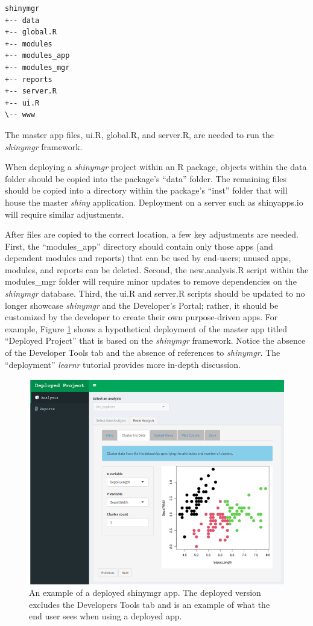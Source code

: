 \begin{verbatim}
shinymgr
+-- data
+-- global.R
+-- modules
+-- modules_app
+-- modules_mgr
+-- reports
+-- server.R
+-- ui.R
\-- www
\end{verbatim}

The master app files, ui.R, global.R, and server.R, are needed to run the \emph{shinymgr} framework.

When deploying a \emph{shinymgr} project within an R package, objects within the data folder should be copied into the package's ``data'' folder. The remaining files should be copied into a directory within the package's ``inst'' folder that will house the master \emph{shiny} application. Deployment on a server such as shinyapps.io will require similar adjustments.

After files are copied to the correct location, a few key adjustments are needed. First, the ``modules\_app'' directory should contain only those apps (and dependent modules and reports) that can be used by end-users; unused apps, modules, and reports can be deleted. Second, the new.analysis.R script within the modules\_mgr folder will require minor updates to remove dependencies on the \emph{shinymgr} database. Third, the ui.R and server.R scripts should be updated to no longer showcase \emph{shinymgr} and the Developer's Portal; rather, it should be customized by the developer to create their own purpose-driven apps. For example, Figure \ref{fig:fig6} shows a hypothetical deployment of the master app titled ``Deployed Project'' that is based on the \emph{shinymgr} framework. Notice the absence of the Developer Tools tab and the absence of references to \emph{shinymgr}. The ``deployment'' \emph{learnr} tutorial provides more in-depth discussion.

\begin{figure}
\includegraphics[width=1\linewidth]{images/figure6} \caption{An example of a deployed shinymgr app. The deployed version excludes the Developers Tools tab and is an example of what the end user sees when using a deployed app.}\label{fig:fig6}
\end{figure}

